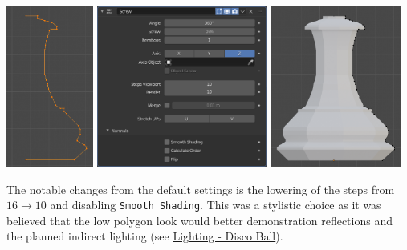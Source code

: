 \documentclass[11pt]{article}
\begin{document}
\begin{center}
\includegraphics[height=150pt]{Images/modelling piece inprogress.png}
\includegraphics[height=150pt]{Images/screw settings.png}
\includegraphics[height=150pt]{Images/pawn model.png}
\end{center}
The notable changes from the default settings is the lowering of the steps from
\(16 \to 10\) and disabling \texttt{Smooth Shading}. This was a stylistic choice as it
was believed that the low polygon look would better demonstration reflections and
the planned indirect lighting (see \hyperref[sec:org0755980]{Lighting - Disco Ball}).
\end{document}
